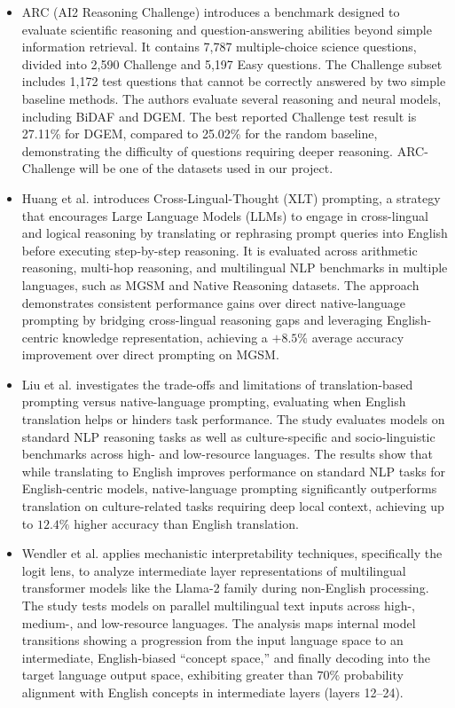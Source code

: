 \documentclass[11pt]{article}
\begin{document}
\begin{itemize}
\item ARC (AI2 Reasoning Challenge) \cite{clark2018arc} introduces a benchmark designed to evaluate scientific reasoning and question-answering abilities beyond simple information retrieval. It contains 7,787 multiple-choice science questions, divided into 2,590 Challenge and 5,197 Easy questions. The Challenge subset includes 1,172 test questions that cannot be correctly answered by two simple baseline methods. The authors evaluate several reasoning and neural models, including BiDAF and DGEM. The best reported Challenge test result is 27.11\% for DGEM, compared to 25.02\% for the random baseline, demonstrating the difficulty of questions requiring deeper reasoning. ARC-Challenge will be one of the datasets used in our project.
\item Huang et al. \cite{huang-etal-2023-languages} introduces Cross-Lingual-Thought (XLT) prompting, a strategy that encourages Large Language Models (LLMs) to engage in cross-lingual and logical reasoning by translating or rephrasing prompt queries into English before executing step-by-step reasoning. It is evaluated across arithmetic reasoning, multi-hop reasoning, and multilingual NLP benchmarks in multiple languages, such as MGSM and Native Reasoning datasets. The approach demonstrates consistent performance gains over direct native-language prompting by bridging cross-lingual reasoning gaps and leveraging English-centric knowledge representation, achieving a $+8.5\%$ average accuracy improvement over direct prompting on MGSM.

\item Liu et al. \cite{liu-etal-2025-translation} investigates the trade-offs and limitations of translation-based prompting versus native-language prompting, evaluating when English translation helps or hinders task performance. The study evaluates models on standard NLP reasoning tasks as well as culture-specific and socio-linguistic benchmarks across high- and low-resource languages. The results show that while translating to English improves performance on standard NLP tasks for English-centric models, native-language prompting significantly outperforms translation on culture-related tasks requiring deep local context, achieving up to $12.4\%$ higher accuracy than English translation.

\item Wendler et al. \cite{wendler-etal-2024-llamas} applies mechanistic interpretability techniques, specifically the logit lens, to analyze intermediate layer representations of multilingual transformer models like the Llama-2 family during non-English processing. The study tests models on parallel multilingual text inputs across high-, medium-, and low-resource languages. The analysis maps internal model transitions showing a progression from the input language space to an intermediate, English-biased ``concept space,'' and finally decoding into the target language output space, exhibiting greater than $70\%$ probability alignment with English concepts in intermediate layers (layers 12--24).


\end{itemize}
\end{document}
